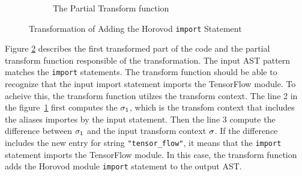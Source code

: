 \begin{figure}[ht!]
\begin{subfigure}[t]{\textwidth}
        \caption{The Partial Transform function}
        \label{fig:trans:ex01:fn}
    \end{subfigure}

    \caption{Transformation of Adding the Horovod {\tt import} Statement}
    \label{fig:trans:ex01}
\end{figure}


Figure \ref{fig:trans:ex01} describes the first transformed part of the code
and the partial transform function responsible of the transformation.
The input AST pattern matches the {\tt import} statements. 
The transform function should be able to recognize that the input import
statement imports the TensorFlow module.
To acheive this, the transform function utilzes the transform context.
The line 2 in the figure~\ref{fig:trans:ex01:fn} first computes the
$\sigma_{1}$, which is the transfom context that includes the aliases
importes by the input statement.
Then the line 3 compute the difference between $\sigma_{1}$ 
and the input transform context $\sigma$.
If the difference includes the new entry for string {\tt "tensor\_flow"},
it means that the {\tt import} statement imports the TensorFlow module.
In this case, the transform function adds the Horovod module {\tt import} 
statement to the output AST.

